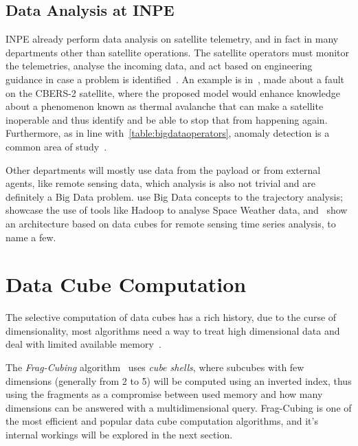 \subsection{Data Analysis at INPE}\label{ch:corr:inpe}

INPE already perform data analysis on satellite telemetry, and in fact in many departments other than satellite operations.
The satellite operators must monitor the telemetries, analyse the incoming data, and act based on engineering guidance in case a problem is identified~\cite{TominagaFerrAmbr:2017:CoSaTe}.
An example is in~\cite{Magalhaes:2012:EsAvTe}, made about a fault on the CBERS-2 satellite, where the proposed model would enhance knowledge about a phenomenon known as thermal avalanche that can make a satellite inoperable and thus identify and be able to stop that from happening again.
Furthermore, as in line with~\autoref{table:bigdataoperators}, anomaly detection is a common area of study~\cite{AzevedoAmbrViei::EsSoTe}.

Other departments will mostly use data from the payload or from external agents, like remote sensing data, which analysis is also not trivial and are definitely a Big Data problem.
 use Big Data concepts to the trajectory analysis;~ showcase the use of tools like Hadoop to analyse Space Weather data, and~ show an architecture based on data cubes for remote sensing time series analysis, to name a few.

\section{Data Cube Computation}\label{ch:corr:cube}

The selective computation of data cubes has a rich history, due to the curse of dimensionality, most algorithms need a way to treat high dimensional data and deal with limited available memory~\cite{hanDataMiningConcepts2011}.

The \textit{Frag-Cubing} algorithm~\cite{liHighdimensionalOLAPMinimal2004} uses \textit{cube shells}, where subcubes with few dimensions (generally from 2 to 5) will be computed using an inverted index, thus using the fragments as a compromise between used memory and how many dimensions can be answered with a multidimensional query.
Frag-Cubing is one of the most efficient and popular data cube computation algorithms, and it's internal workings will be explored in the next section.

